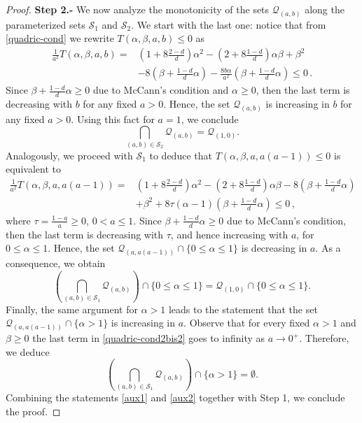 \documentclass[reqno]{amsart}
\begin{document}
\begin{proof}
{\bf Step 2.-} We now analyze the monotonicity of the sets $\mathcal{Q}_{(a,b)}$ along the parameterized sets $\mathcal{S}_1$ and $\mathcal{S}_2$. We start with the last one: notice that from \eqref{quadric-cond} we rewrite $T(\alpha,\beta,a,b)\leq 0$ as
\begin{align*}%
  \frac1{a^2} T(\alpha,\beta,a,b)=&\left(1+8\frac{2-d}{d}\right) \alpha^2 - \left(2+8\frac{1-d}{d}\right) \alpha\beta + \beta^2 \nonumber\\
  &-8\left(\beta+\frac{1-d}{d}\alpha\right)-\frac{8b\alpha}{a^2} \left(\beta+\frac{1-d}{d}\alpha\right) \le0\,.
\end{align*}
Since $\beta+\frac{1-d}{d}\alpha\ge 0$ due to McCann's condition and $\alpha \ge 0$, then the last term is decreasing with $b$ for any fixed $a>0$. Hence, the set $\mathcal{Q}_{(a,b)}$ is increasing in $b$ for any fixed $a>0$. Using this fact for $a=1$, we conclude
$$
\bigcap_{(a,b)\in\mathcal{S}_2} \mathcal{Q}_{(a,b)}=\mathcal{Q}_{(1,0)}.
$$
Analogously, we proceed with $\mathcal{S}_1$ to deduce that $T(\alpha,\beta,a,a(a-1))\leq 0$ is equivalent to
\begin{align}\label{quadric-cond2bis2}
   \frac1{a^2}T(\alpha,\beta,a,a(a-1))=&\left(1+8\frac{2-d}{d}\right) \alpha^2 - \left(2+8\frac{1-d}{d}\right) \alpha\beta  -8\left(\beta+\frac{1-d}{d}\alpha\right)\nonumber\\
  &+ \beta^2+8\tau(\alpha-1) \left(\beta+\frac{1-d}{d}\alpha\right) \le0\,,
\end{align}
where $\tau=\frac{1-a}a\ge 0$, $0<a\le 1$. Since $\beta+\frac{1-d}{d}\alpha\ge 0$ due to McCann's condition, then the last term is decreasing with $\tau$, and hence increasing with $a$, for $0\le \alpha \le 1$. Hence, the set $\mathcal{Q}_{(a,a(a-1))}\cap \{0\le \alpha\le 1\}$ is decreasing in $a$.
As a consequence, we obtain
\begin{equation}\label{aux1}
\left(\bigcap_{(a,b)\in\mathcal{S}_1} \mathcal{Q}_{(a,b)}\right)\cap \{0\le \alpha\le 1\}=\mathcal{Q}_{(1,0)}\cap \{0\le \alpha\le 1\}.
\end{equation}
Finally, the same argument for $\alpha> 1$ leads to the statement that the set $\mathcal{Q}_{(a,a(a-1))}\cap \{\alpha> 1\}$ is increasing in $a$. Observe that for every fixed $\alpha >1$ and $\beta\geq 0$ the last term in \eqref{quadric-cond2bis2} goes to infinity as $a\to 0^+$. Therefore, we deduce
\begin{equation}\label{aux2}
   \left(\bigcap_{(a,b)\in\mathcal{S}_1} \mathcal{Q}_{(a,b)}\right)\cap \{\alpha> 1\}=\emptyset. 
\end{equation}
Combining the statements \eqref{aux1} and \eqref{aux2} together with Step 1, we conclude the proof.
\end{proof}
\end{document}
